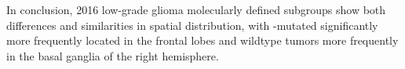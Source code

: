 In conclusion,  2016 low-grade glioma molecularly defined subgroups show both differences and similarities in spatial distribution, with -mutated  significantly more frequently located in the frontal lobes and  wildtype \glspl{tumor} more frequently in the basal ganglia of the right hemisphere.







